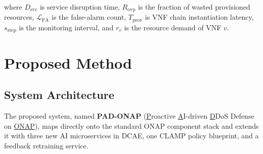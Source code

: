 \documentclass[12pt, a4paper]{article}
\begin{document}
\noindent where $D_{\mathrm{svc}}$ is service disruption time,
$R_{\mathrm{ovp}}$ is the fraction of wasted provisioned resources,
$\mathcal{L}_{\mathrm{FA}}$ is the false-alarm count, $T_{\mathrm{prov}}$
is VNF chain instantiation latency, $s_{\mathrm{step}}$ is the monitoring
interval, and $r_v$ is the resource demand of VNF $v$.

\section{Proposed Method}

\subsection{System Architecture}

The proposed system, named \textbf{PAD-ONAP}
(\underline{P}roactive \underline{A}I-driven \underline{D}DoS Defense
on \underline{ONAP}), maps directly onto the standard ONAP component stack
and extends it with three new AI microservices in DCAE, one CLAMP policy
blueprint, and a feedback retraining service.
\end{document}
